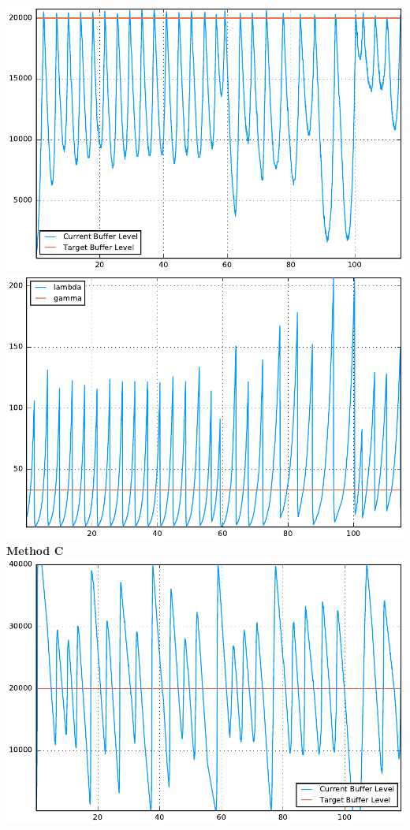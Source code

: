 \documentclass[12pt]{article}
\newenvironment{problem}[2][Problem]{\begin{trivlist}
\item[\hskip \labelsep {\bfseries #1}\hskip \labelsep {\bfseries #2.}]}{\end{trivlist}}
\begin{document}
\begin{problem}{1}
\includegraphics[scale = .5]{listen1.pdf}
\includegraphics[scale = .5]{stream1.pdf}
\\
\textbf{Method C} \\
\includegraphics[scale = .5]{listen2.pdf}

\end{problem}
\end{document}
